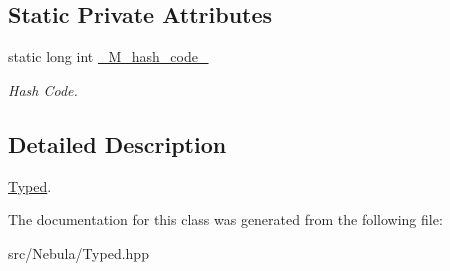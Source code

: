 \subsection*{\-Static \-Private \-Attributes}
\begin{DoxyCompactItemize}
\item 
\hypertarget{classNeb_1_1Typed_a2bd73a4e10813616f46086157538bece}{static long int \hyperlink{classNeb_1_1Typed_a2bd73a4e10813616f46086157538bece}{\-\_\-\-M\-\_\-hash\-\_\-code\-\_\-}}\label{classNeb_1_1Typed_a2bd73a4e10813616f46086157538bece}

\begin{DoxyCompactList}\small\item\em \-Hash \-Code. \end{DoxyCompactList}\end{DoxyCompactItemize}


\subsection{\-Detailed \-Description}
\hyperlink{classNeb_1_1Typed}{\-Typed}. 

\-The documentation for this class was generated from the following file\-:\begin{DoxyCompactItemize}
\item 
src/\-Nebula/\-Typed.\-hpp\end{DoxyCompactItemize}
